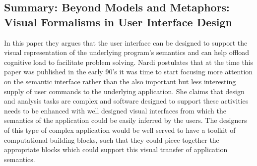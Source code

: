 \documentclass{sig-alternate}
\begin{document}
\subsection{Summary: Beyond Models and Metaphors: Visual Formalisms in User
Interface Design\cite{Nardi:BeyondModels}}
In this paper they argues that the user interface can be designed to support
the visual representation of the underlying program's semantics and can help
offload cognitive load to facilitate problem solving. Nardi postulates that at
the time this paper was published in the early 90's it was time to start
focusing more attention on the semantic interface rather than the also
important but less interesting supply of user commands to the underlying
application. She claims that design and analysis tasks are complex and software
designed to support these activities needs to be enhanced with well designed
visual interfaces from which the semantics of the application could be easily
inferred by the users. The designers of this type of complex application would
be well served to have a toolkit of computational building blocks, such that
they could piece together the appropriate blocks which could support this
visual transfer of application semantics.
\end{document}

